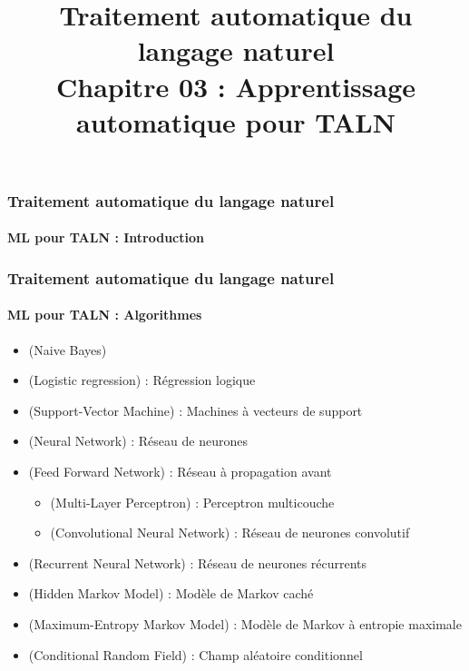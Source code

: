 \documentclass[xcolor=table]{beamer}
\title[TALN : 03- ML pour TALN]%
{Traitement automatique du langage naturel\\Chapitre 03 : Apprentissage automatique pour TALN}
\begin{document}
	
\begin{frame}
\frametitle{Traitement automatique du langage naturel}
\framesubtitle{ML pour TALN : Introduction}


\end{frame}

\begin{frame}
	\frametitle{Traitement automatique du langage naturel}
	\framesubtitle{ML pour TALN : Algorithmes}
	
	\begin{itemize}
		\item {} (Naive Bayes)
		\item {} (Logistic regression) : Régression logique
		\item {} (Support-Vector Machine) : Machines à vecteurs de support 
		\item {} (Neural Network) : Réseau de neurones
		\item {} (Feed Forward Network) : Réseau à propagation avant
		\begin{itemize}
			\item {} (Multi-Layer Perceptron) : Perceptron multicouche
			\item {} (Convolutional Neural Network) : Réseau de neurones convolutif
		\end{itemize}
		\item {} (Recurrent Neural Network) : Réseau de neurones récurrents
		\item {} (Hidden Markov Model) : Modèle de Markov caché
		\item {} (Maximum-Entropy Markov Model) : Modèle de Markov à entropie maximale
		\item {} (Conditional Random Field) : Champ aléatoire conditionnel
	\end{itemize}
	
\end{frame}
\end{document}
